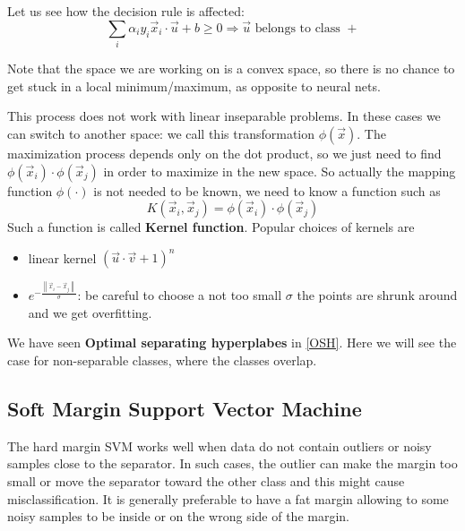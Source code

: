 \documentclass[12pt, letterpaper]{article}
\theoremstyle{definition}
\newcommand\norm[1]{\left\lVert#1\right\rVert}
\let\tb\textbf
\begin{document}
Let us see how the decision rule is affected:
\begin{equation}
\sum_i \alpha_i y_i \vec{x}_i \cdot \vec{u} + b \ge 0 \Rightarrow \vec{u} \text{ belongs to class } +
\end{equation}

Note that the space we are working on is a convex space, so there is no chance to get stuck in a local minimum/maximum, as opposite to neural nets.

This process does not work with linear inseparable problems. In these cases we can switch to another space: we call this transformation $\phi(\vec{x})$. The maximization process depends only on the dot product, so we just need to find $\phi(\vec{x}_i)\cdot \phi(\vec{x}_j)$ in order to maximize in the new space. So actually the mapping function $\phi(\cdot)$ is not needed to be known, we need to know a function such as
\begin{equation}
K(\vec{x}_i, \vec{x}_j) = \phi(\vec{x}_i)\cdot \phi(\vec{x}_j)
\end{equation} 
Such a function is called \tb{Kernel function}. Popular choices of kernels are
\begin{itemize}
\item linear kernel $\left(\vec{u} \cdot \vec{v}+1\right)^n$
\item $e^{-\frac{\norm{\vec{x}_i - \vec{x}_j}}{\sigma}}$: be careful to choose a not too small $\sigma$ the points are shrunk around and we get overfitting.
\end{itemize}

We have seen \textbf{Optimal separating hyperplabes} in \autoref{OSH}. Here we will see the case for non-separable classes, where the classes overlap.
\subsection{Soft Margin Support Vector Machine}
The hard margin SVM works well when data do not contain outliers or noisy samples close to the separator. In such cases, the outlier can make the margin too small or move the separator toward the other class and this might cause misclassification. It is generally preferable to have a fat margin allowing to some noisy samples to be inside or on the wrong side of the margin.
\end{document}
